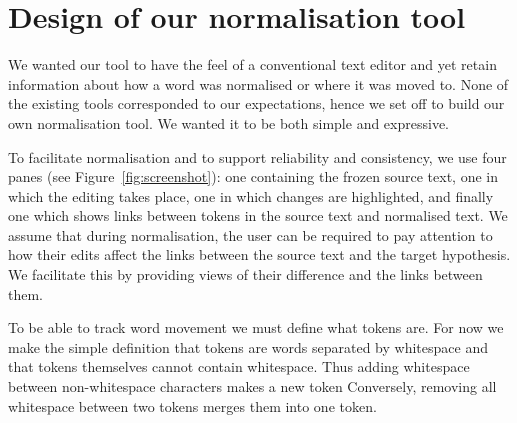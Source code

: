 \documentclass[10pt, a4paper]{article}
\newcommand{\dan}[1]{{\color{Fuchsia}{Dan: #1}}}
\newcommand{\elena}[1]{{\color{BrickRed}{Elena: #1}}}
\newcommand{\mats}[1]{{\color{Blue}{Mats: #1}}}
\begin{document}

\section{Design of our normalisation tool}
\label{sec:norm_tool}

We wanted our tool to have the feel of a conventional text editor and yet retain
information about how a word was normalised or where it was moved to. None of the existing tools corresponded to our expectations, hence we set off to build our own normalisation tool. We wanted it to be both simple and expressive.

To facilitate normalisation and to support reliability and consistency,
we use four panes (see Figure~\ref{fig:screenshot}): one containing the
frozen source text, one in which the editing takes place, one in which
changes are highlighted, and finally one which shows links between tokens in the source text and normalised text.
We assume that during normalisation, the user can be required to pay attention
to how their edits affect the links between the source text and the target
hypothesis. We facilitate this by providing views of their difference and
the links between them.

To be able to track word movement we must define what tokens are.
For now we make the simple definition that tokens are words separated
by whitespace and that tokens themselves cannot contain whitespace.
Thus adding whitespace between non-whitespace characters makes a new token
Conversely, removing all whitespace between two tokens merges them into one token.
\end{document}
